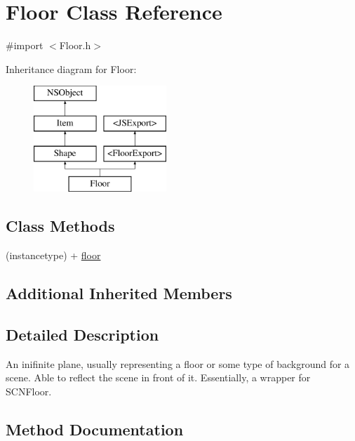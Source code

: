\hypertarget{interface_floor}{}\section{Floor Class Reference}
\label{interface_floor}


{\ttfamily \#import $<$Floor.\+h$>$}

Inheritance diagram for Floor\+:\begin{figure}[H]
\begin{center}
\leavevmode
\includegraphics[height=4.000000cm]{interface_floor}
\end{center}
\end{figure}
\subsection*{Class Methods}
\begin{DoxyCompactItemize}
\item 
(instancetype) + \hyperlink{interface_floor_a5493d4a9d2e6cfb3602a690568873d12}{floor}
\end{DoxyCompactItemize}
\subsection*{Additional Inherited Members}


\subsection{Detailed Description}
An inifinite plane, usually representing a floor or some type of background for a scene. Able to reflect the scene in front of it. Essentially, a wrapper for {\ttfamily S\+C\+N\+Floor}. 

\subsection{Method Documentation}
\hypertarget{interface_floor_a5493d4a9d2e6cfb3602a690568873d12}{}
